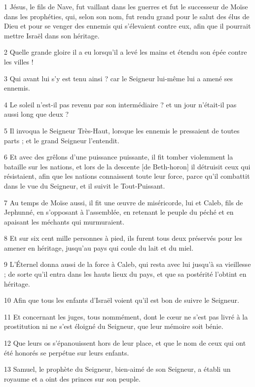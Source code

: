 
\par 1 Jésus, le fils de Nave, fut vaillant dans les guerres et fut le successeur de Moïse dans les prophéties, qui, selon son nom, fut rendu grand pour le salut des élus de Dieu et pour se venger des ennemis qui s'élevaient contre eux, afin que il pourrait mettre Israël dans son héritage.
\par 2 Quelle grande gloire il a eu lorsqu'il a levé les mains et étendu son épée contre les villes !
\par 3 Qui avant lui s'y est tenu ainsi ? car le Seigneur lui-même lui a amené ses ennemis.
\par 4 Le soleil n'est-il pas revenu par son intermédiaire ? et un jour n'était-il pas aussi long que deux ?
\par 5 Il invoqua le Seigneur Très-Haut, lorsque les ennemis le pressaient de toutes parts ; et le grand Seigneur l'entendit.
\par 6 Et avec des grêlons d'une puissance puissante, il fit tomber violemment la bataille sur les nations, et lors de la descente [de Beth-horon] il détruisit ceux qui résistaient, afin que les nations connaissent toute leur force, parce qu'il combattit dans le vue du Seigneur, et il suivit le Tout-Puissant.
\par 7 Au temps de Moïse aussi, il fit une œuvre de miséricorde, lui et Caleb, fils de Jephunné, en s'opposant à l'assemblée, en retenant le peuple du péché et en apaisant les méchants qui murmuraient.
\par 8 Et sur six cent mille personnes à pied, ils furent tous deux préservés pour les amener en héritage, jusqu'au pays qui coule du lait et du miel.
\par 9 L'Éternel donna aussi de la force à Caleb, qui resta avec lui jusqu'à sa vieillesse ; de sorte qu'il entra dans les hauts lieux du pays, et que sa postérité l'obtint en héritage.
\par 10 Afin que tous les enfants d'Israël voient qu'il est bon de suivre le Seigneur.
\par 11 Et concernant les juges, tous nommément, dont le cœur ne s'est pas livré à la prostitution ni ne s'est éloigné du Seigneur, que leur mémoire soit bénie.
\par 12 Que leurs os s'épanouissent hors de leur place, et que le nom de ceux qui ont été honorés se perpétue sur leurs enfants.
\par 13 Samuel, le prophète du Seigneur, bien-aimé de son Seigneur, a établi un royaume et a oint des princes sur son peuple.
